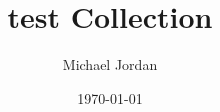 \documentclass{report}
\title{test Collection}
\author{Michael Jordan}
\date{\today}
\begin{document}
\newpage

\maketitle

\newpage

\renewcommand{\contentsname}{Table of Content}
\tableofcontents


\begin{spacing}{1.5}







\end{spacing}

\end{document}
